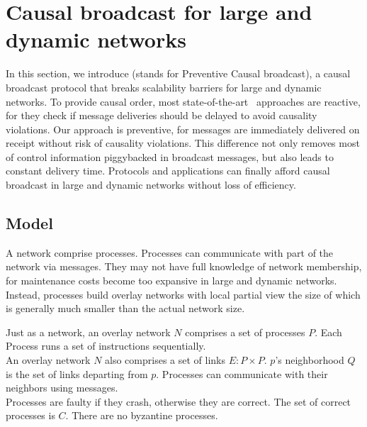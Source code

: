 
\section{Causal broadcast for large and dynamic networks}
\label{sec:proposal}

In this section, we introduce \CBROADCAST (stands for Preventive Causal
broadcast), a causal broadcast protocol that breaks scalability barriers for
large and dynamic networks.
To provide causal order, most
state-of-the-art~\cite{almeida2008interval,birman1987reliable,fidge1988timestamps,hadzilacos1993fault,mattern1989virtual,mostefaoui2017probabilistic,singhal1992efficient}
approaches are reactive, for they check if message deliveries should be delayed
to avoid causality violations. Our approach is preventive, for messages are
immediately delivered on receipt without risk of causality violations. This
difference not only removes most of control information piggybacked in broadcast
messages, but also leads to constant delivery time. Protocols and applications
can finally afford causal broadcast in large and dynamic networks without loss
of efficiency.


\subsection{Model}

A network comprise processes. Processes can communicate with part of the network
via messages. They may not have full knowledge of network membership, for
maintenance costs become too expansive in large and dynamic networks. Instead,
processes build overlay networks with local partial view the size of which is
generally much smaller than the actual network size.

\begin{definition}
  Just as a network, an overlay network $N$ comprises a set of processes
  $P$. Each Process runs a
  set of instructions sequentially. \\
  An overlay network $N$ also comprises a set of links $E: P \times P$. $p$'s
  neighborhood $Q$ is the set of links departing from $p$. Processes can
  communicate with their neighbors using messages. \\
  Processes are faulty if they crash, otherwise they are correct. The set of
  correct processes is $C$. There are no byzantine processes.
\end{definition}

